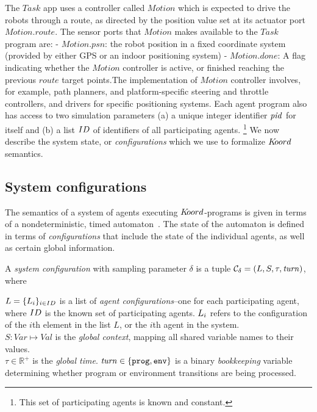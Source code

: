 The $\mathit{Task}$ app  uses a controller called $\mathit{Motion}$ which is expected to drive the robots through a route, as directed by the position value set at its actuator port $\mathit{Motion.route}$. The sensor ports that $\mathit{Motion}$ makes available to the $\mathit{Task}$ program are: - $\mathit{Motion.psn}$: the robot position in a fixed coordinate system (provided by either GPS or an indoor positioning system) - $\mathit{Motion.done}$: A flag indicating whether the $\mathit{Motion}$ controller is active, or finished reaching the previous $\mathit{route}$ target points.The implementation of $\mathit{Motion}$ controller involves, for example, path planners, and platform-specific steering and throttle controllers, and drivers for specific positioning systems. 
 Each agent program also has access to two simulation parameters (a) a unique integer identifier $\mathit{pid}$ for itself and (b)  a list $ID$ of identifiers of all participating agents. \footnote{This set of participating agents is known and constant.} We now describe the system state, or \emph{configurations} which we use to formalize $K\kern-2pt oord$ semantics. 
 
\subsection{System configurations}

The semantics of a system of agents executing $K\kern-2pt oord$-programs is given in terms of a nondeterministic, timed automaton~\cite{TIOAmon}. The state of the automaton is defined in terms of {\em configurations\/} that include the state of the individual agents, as well as certain global information.

A {\em system configuration\/} with sampling parameter $\delta$ is a tuple 
$\mathcal{C}_\delta = (L,{S},\tau,\mathit{turn})$, where
\flushleft

 ${L} = \{L_{i}\}_{i\in ID}$ is a list of {\em agent configurations\/}--one for each participating agent, where $ID$ is the known set of participating agents. $L_{i}$ refers to the configuration of the $i$th element in the list $L$, or the $i$th agent in the system.   \\
 ${S} : Var \mapsto Val$ is the {\em global context\/}, mapping all shared variable names to their values. \\
 $\tau\in \mathbb{R}^{+}$ is the {\em global time\/}.
 $\mathit{turn}\in\{\mathtt{prog,env}\}$ is a binary \emph{bookkeeping} variable determining whether  program or environment transitions are being processed. 

